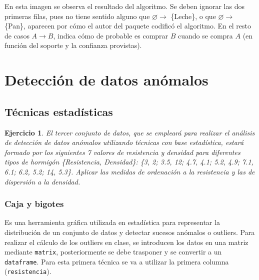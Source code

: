 \documentclass[12pt]{report}\usepackage[]{graphicx}\usepackage[dvipsnames]{xcolor}
\newtheorem{exercise}{Ejercicio}[section]
\begin{document}
			En esta imagen se observa el resultado del algoritmo. Se deben ignorar las dos primeras filas, pues no tiene sentido alguno que $\varnothing \rightarrow$ \{Leche\}, o que $\varnothing \rightarrow$ \{Pan\}, aparecen por cómo el autor del paquete codificó el algoritmo. En el resto de casos $A \rightarrow B$, indica cómo de probable es comprar $B$ cuando se compra $A$ (en función del soporte y la confianza provistas). 
			
			
		\section{Detección de datos anómalos}
			
			\subsection{Técnicas estadísticas}
			
				\begin{exercise}
					El tercer conjunto de datos, que se empleará para realizar el análisis de detección de datos anómalos utilizando técnicas con base estadística, estará formado por los siguientes 7 valores de resistencia y densidad para diferentes tipos de hormigón \{Resistencia, Densidad\}: \{3, 2; 3.5, 12; 4.7, 4.1; 5.2, 4.9; 7.1, 6.1; 6.2, 5.2; 14, 5.3\}. Aplicar las medidas de ordenación a la resistencia y las de dispersión a la densidad.
				\end{exercise}
				
				\subsubsection{Caja y bigotes}\label{subsub:caja_bigotes}
				
					Es una herramienta gráfica utilizada en estadística para representar la distribución de un conjunto de datos y detectar sucesos anómalos o outliers. Para realizar el cálculo de los outliers en clase, se introducen los datos en una matriz mediante \texttt{matrix}, posteriormente se debe trasponer y se convertir a un \texttt{dataframe}. Para esta primera técnica se va a utilizar la primera columna (\texttt{resistencia}).
					
\end{document}
